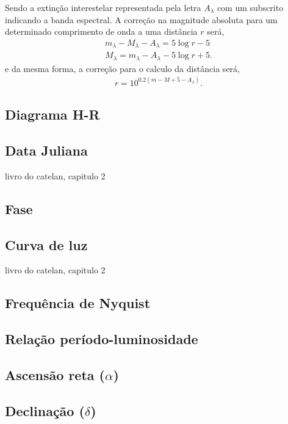 Sendo a extinção interestelar representada pela letra $A_{\lambda}$ com um subscrito indicando a banda espectral. A correção na magnitude absoluta para um determinado comprimento de onda a uma distância $r$ será,
\begin{align}
m_{\lambda} - M_{\lambda} - A_{\lambda} = 5 \log r - 5 \\
M_{\lambda} = m_{\lambda} - A_{\lambda} - 5 \log r + 5.
\end{align} 
e da mesma forma, a correção para o calculo da distância será,
\begin{align}
r = 10^{0.2 \left(m -M + 5 - A_{\lambda} \right)}.
\end{align}


\subsection{Diagrama H-R}
 
\subsection{Data Juliana}

livro do catelan, capitulo 2

\subsection{Fase}

\subsection{Curva de luz}

livro do catelan, capitulo 2

\subsection{Frequência de Nyquist}

\subsection{Relação período-luminosidade}

\subsection{Ascensão reta ($\alpha$)}

\subsection{Declinação ($\delta$)}